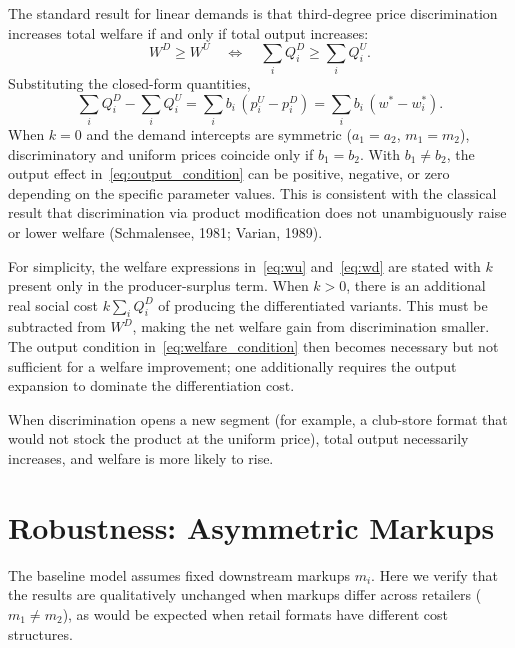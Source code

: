 \documentclass[12pt]{article}
\theoremstyle{definition}
\begin{document}
The standard result for linear demands is that third-degree price discrimination increases total welfare if and only if total output increases:
\begin{equation}\label{eq:welfare_condition}
W^D \ge W^U \quad\Longleftrightarrow\quad \sum_{i} Q_i^D \ge \sum_{i} Q_i^U.
\end{equation}
Substituting the closed-form quantities,
\begin{equation}\label{eq:output_condition}
\sum_{i} Q_i^D - \sum_{i} Q_i^U = \sum_{i} b_i\,(p_i^U - p_i^D) = \sum_i b_i\,(w^* - w_i^*).
\end{equation}
When $k = 0$ and the demand intercepts are symmetric ($a_1 = a_2$, $m_1 = m_2$), discriminatory and uniform prices coincide only if $b_1 = b_2$. With $b_1 \ne b_2$, the output effect in~\eqref{eq:output_condition} can be positive, negative, or zero depending on the specific parameter values. This is consistent with the classical result that discrimination via product modification does not unambiguously raise or lower welfare (Schmalensee, 1981; Varian, 1989).

For simplicity, the welfare expressions in~\eqref{eq:wu} and~\eqref{eq:wd} are stated with $k$ present only in the producer-surplus term. When $k > 0$, there is an additional real social cost $k\sum_i Q_i^D$ of producing the differentiated variants. This must be subtracted from $W^D$, making the net welfare gain from discrimination smaller. The output condition in~\eqref{eq:welfare_condition} then becomes necessary but not sufficient for a welfare improvement; one additionally requires the output expansion to dominate the differentiation cost.

When discrimination opens a new segment (for example, a club-store format that would not stock the product at the uniform price), total output necessarily increases, and welfare is more likely to rise.

\section{Robustness: Asymmetric Markups}\label{app:robustness}

The baseline model assumes fixed downstream markups $m_i$.
Here we verify that the results are qualitatively unchanged when markups differ across retailers ($m_1 \ne m_2$), as would be expected when retail formats have different cost structures.
\end{document}
